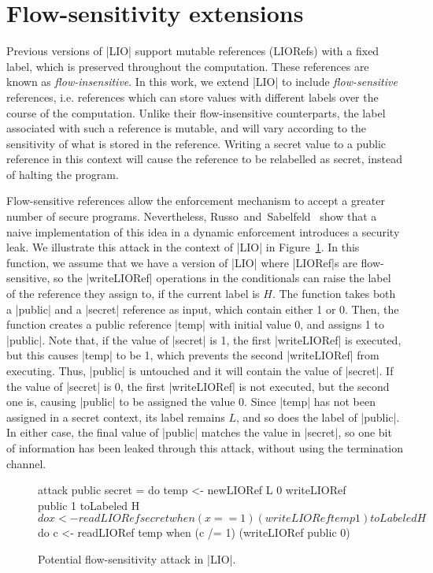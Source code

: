 \section{Flow-sensitivity extensions}

Previous versions of |LIO| support mutable references (LIORefs) with a
fixed label, which is preserved throughout the computation. These
references are known as \emph{flow-insensitive}. In this work, we
extend |LIO| to include \emph{flow-sensitive} references,
i.e. references which can store values with different labels over the
course of the computation. Unlike their flow-insensitive counterparts,
the label associated with such a reference is mutable, and will vary
according to the sensitivity of what is stored in the
reference. Writing a secret value to a public reference in this
context will cause the reference to be relabelled as secret, instead
of halting the program.

Flow-sensitive references allow the enforcement mechanism to accept a
greater number of secure programs. Nevertheless,
Russo~and~Sabelfeld~\citep{?} show that a naive implementation of this
idea in a dynamic enforcement introduces a security leak. We
illustrate this attack in the context of |LIO| in
Figure~\ref{fig:fs-attack}. In this function, we assume that we have a
version of |LIO| where |LIORef|s are flow-sensitive, so the
|writeLIORef| operations in the conditionals can raise the label of
the reference they assign to, if the current label is $H$. The
function takes both a |public| and a |secret| reference as input,
which contain either 1 or 0. Then, the function creates a public
reference |temp| with initial value 0, and assigns 1 to |public|.
Note that, if the value of |secret| is 1, the first |writeLIORef| is
executed, but this causes |temp| to be 1, which prevents the second
|writeLIORef| from executing. Thus, |public| is untouched and it will
contain the value of |secret|. If the value of |secret| is 0, the
first |writeLIORef| is not executed, but the second one is, causing
|public| to be assigned the value 0. Since |temp| has not been
assigned in a secret context, its label remains $L$, and so does the
label of |public|. In either case, the final value of |public| matches
the value in |secret|, so one bit of information has been leaked
through this attack, without using the termination channel.

\begin{figure}[!ht]
\vspace*{-5pt}
\begin{code}
attack public secret = 
  do  temp    <- newLIORef L 0
      writeLIORef public 1
      toLabeled H $ do  x <- readLIORef secret
                        when (x == 1) (writeLIORef temp 1)
      toLabeled H $ do  c <- readLIORef temp
                        when (c /= 1) (writeLIORef public 0)
\end{code}
\caption{Potential flow-sensitivity attack in |LIO|.\label{fig:fs-attack}}
\vspace*{-5pt}
\end{figure}

